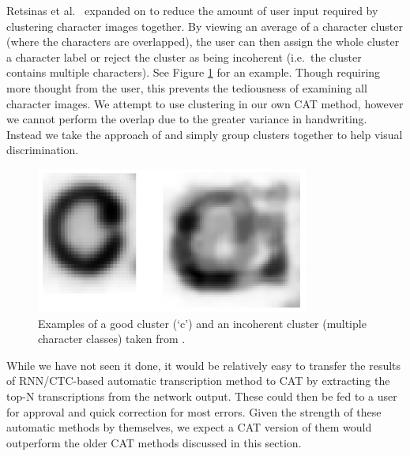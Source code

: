 \documentclass[ms,electronic,twosidetoc,letterpaper,chaptercenter,parttop,lol,lof,lot]{byumsphd}
\begin{document}
Retsinas et al.~\cite{Retsinas2015} expanded on \cite{Neudecker2010} to reduce the amount of user input required by clustering character images together. By viewing an average of a character cluster (where the characters are overlapped), the user can then assign the whole cluster a character label or reject the cluster as being incoherent (i.e.~the cluster contains multiple characters). See Figure \ref{fig:retsinas_ex} for an example. Though requiring more thought from the user, this prevents the tediousness of examining all character images. %
We attempt to use clustering in our own CAT method, however we cannot perform the overlap due to the greater variance in handwriting. Instead we take the approach of \cite{Clawson2014} and simply group clusters together to help visual discrimination.

\begin{figure}
    \centering
    \includegraphics[width=.4\textwidth]{retsinas_ex}
    \caption{Examples of a good cluster (`c') and an incoherent cluster (multiple character classes) taken from \cite{Retsinas2015}.}
    \label{fig:retsinas_ex}
\end{figure}

While we have not seen it done, it would be relatively easy to transfer the results of RNN/CTC-based automatic transcription method to CAT by extracting the top-N transcriptions from the network output. These could then be fed to a user for approval and quick correction for most errors. Given the strength of these automatic methods by themselves, we expect a CAT version of them would outperform the older CAT methods discussed in this section. 




\end{document}
